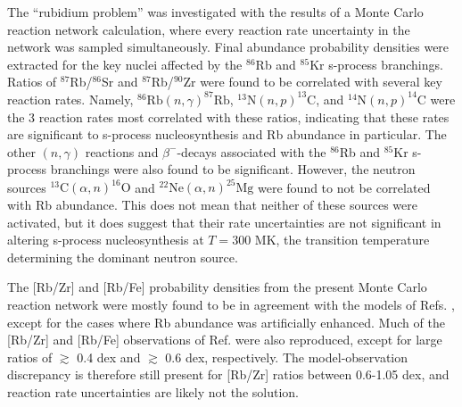 The ``rubidium problem'' was investigated with the results of a Monte Carlo reaction network calculation, where every reaction rate uncertainty in the network was sampled simultaneously. Final abundance probability densities were extracted for the key nuclei affected by the $^{86}$Rb and $^{85}$Kr s-process branchings. Ratios of $^{87}$Rb/$^{86}$Sr and $^{87}$Rb/$^{90}$Zr were found to be correlated with several key reaction rates. Namely, $^{86}\mathrm{Rb}(n,\gamma)^{87}\mathrm{Rb}$, $^{13}\mathrm{N}(n,p)^{13}\mathrm{C}$, and $^{14}\mathrm{N}(n,p)^{14}\mathrm{C}$ were the 3 reaction rates most correlated with these ratios, indicating that these rates are significant to s-process nucleosynthesis and Rb abundance in particular. The other $(n,\gamma)$ reactions and $\beta^{-}$-decays associated with the $^{86}$Rb and $^{85}$Kr s-process branchings were also found to be significant. However, the neutron sources $^{13}\mathrm{C}(\alpha,n)^{16}\mathrm{O}$ and $^{22}\mathrm{Ne}(\alpha,n)^{25}\mathrm{Mg}$ were found to not be correlated with Rb abundance. This does not mean that neither of these sources were activated, but it does suggest that their rate uncertainties are not significant in altering s-process nucleosynthesis at $T = 300$ MK, the transition temperature determining the dominant neutron source.

The [Rb/Zr] and [Rb/Fe] probability densities from the present Monte Carlo reaction network were mostly found to be in agreement with the models of Refs. \cite{Karakas2012,Raai2012,Karakas2016,Pignatari2016}, except for the cases where Rb abundance was artificially enhanced. Much of the [Rb/Zr] and [Rb/Fe] observations of Ref. \cite{Perez2017} were also reproduced, except for large ratios of $\gtrsim$ 0.4 dex and $\gtrsim$ 0.6 dex, respectively. The model-observation discrepancy is therefore still present for [Rb/Zr] ratios between 0.6-1.05 dex, and reaction rate uncertainties are likely not the solution.